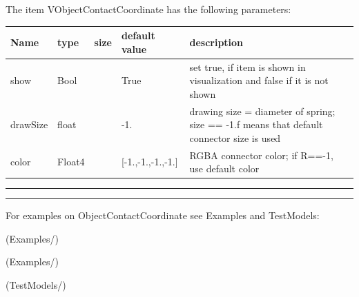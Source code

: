The item VObjectContactCoordinate has the following parameters:\vspace{-1cm}\\ 
\begin{center}
  \footnotesize
  \begin{longtable}{| p{4.5cm} | p{2.5cm} | p{0.5cm} | p{2.5cm} | p{6cm} |}
    \hline
    \bf Name & \bf type & \bf size & \bf default value & \bf description \\ \hline
    show &     Bool &      &     True &     set true, if item is shown in visualization and false if it is not shown\\ \hline
    drawSize &     float &      &     -1. &     drawing size = diameter of spring; size == -1.f means that default connector size is used\\ \hline
    color &     Float4 &      &     [-1.,-1.,-1.,-1.] &     RGBA connector color; if R==-1, use default color\\ \hline
	  \end{longtable}
	\end{center}
\par\noindent\rule{\textwidth}{0.4pt}
\label{description_ObjectContactCoordinate}
\vspace{6pt}\par\noindent\rule{\textwidth}{0.4pt}
%
\noindent For examples on ObjectContactCoordinate see Examples and TestModels:
\bi
\item {} (Examples/)
\item {} (Examples/)
\item {} (TestModels/)
\ei

%
\newpage

